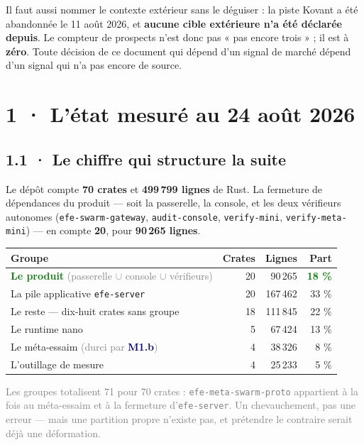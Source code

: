 \documentclass[10pt]{article}
\newcommand{\best}[1]{\textcolor{green}{\textbf{#1}}}
\newcommand{\sz}[1]{\textcolor{grey}{\small\textsf{#1}}}
\newcommand{\code}[1]{\texttt{\small #1}}
\newcommand{\mm}[1]{\textbf{\textcolor{navy}{#1}}}
\begin{document}
Il faut aussi nommer le contexte extérieur sans le déguiser : la piste Kovant a été abandonnée le
11 août 2026, et \textbf{aucune cible extérieure n'a été déclarée depuis}. Le compteur de prospects
n'est donc pas « pas encore trois » ; il est à \textbf{zéro}. Toute décision de ce document qui
dépend d'un signal de marché dépend d'un signal qui n'a pas encore de source.

\section{1 · L'état mesuré au 24 août 2026}

\subsection{1.1 · Le chiffre qui structure la suite}

Le dépôt compte \textbf{70 crates} et \textbf{499\,799 lignes} de Rust. La fermeture de
dépendances du produit --- soit la passerelle, la console, et les deux vérifieurs autonomes
(\code{efe-swarm-gateway}, \code{audit-console}, \code{verify-mini},
\code{verify-meta-mini}) --- en compte \textbf{20}, pour \textbf{90\,265 lignes}.

\begin{center}\small
\renewcommand{\arraystretch}{1.24}
\begin{tabular}{@{}>{\raggedright\arraybackslash}p{6.4cm} r r r@{}}
\toprule
\textbf{Groupe} & \textbf{Crates} & \textbf{Lignes} & \textbf{Part} \\
\midrule
\best{Le produit} \sz{(passerelle $\cup$ console $\cup$ vérifieurs)} & 20 & 90\,265 & \best{18 \%} \\
\addlinespace[2pt]
La pile applicative \code{efe-server} & 20 & 167\,462 & 33 \% \\
Le reste --- dix-huit crates sans groupe & 18 & 111\,845 & 22 \% \\
Le runtime nano & 5 & 67\,424 & 13 \% \\
Le méta-essaim \sz{(durci par \mm{M1.b})} & 4 & 38\,326 & 8 \% \\
L'outillage de mesure & 4 & 25\,233 & 5 \% \\
\bottomrule
\end{tabular}
\end{center}

\sz{Les groupes totalisent 71 pour 70 crates : \code{efe-meta-swarm-proto} appartient à la fois au
méta-essaim et à la fermeture d'\code{efe-server}. Un chevauchement, pas une erreur --- mais une
partition propre n'existe pas, et prétendre le contraire serait déjà une déformation.}
\end{document}
